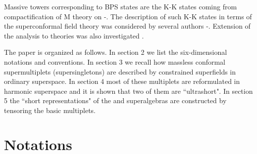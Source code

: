 \documentclass[a4paper,12pt]{article}
\begin{document}
Massive towers corresponding to \coordHE{} BPS states are the K-K 
states \cite{GNW} coming from compactification of M theory on  
\coordHE{} \cite{PPN}-\cite{MTN}. The description of such 
K-K states in terms of the \coordHE{} superconformal field theory was 
considered by several authors \cite{AOY}-\cite{ ABS}. Extension 
of the analysis to \coordHE{} theories was also investigated 
\cite{FKPZ,GP}. 


The paper is organized as follows. In section 2 we list the 
six-dimensional notations and conventions. In section 3 we recall 
how massless conformal supermultiplets (supersingletons) are 
described by constrained superfields in ordinary superspace. In 
section 4 most of these multiplets are reformulated in harmonic 
superspace and it is shown that two of them are ``ultrashort". In 
section 5 the ``short representations" of the \coordHE{} and 
\coordHE{} superalgebras are constructed by tensoring the basic 
multiplets.  




\section{Notations}
\end{document}
